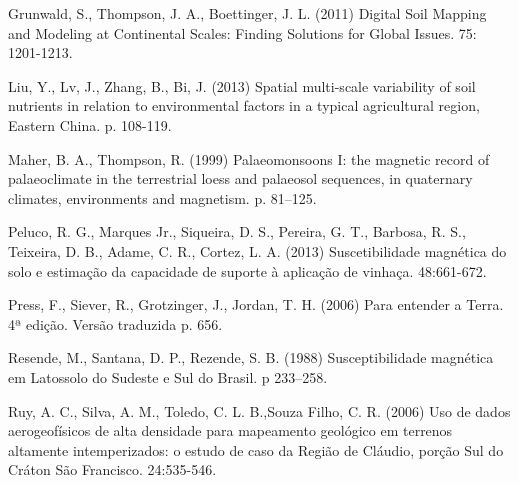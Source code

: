 \begin{footnotesize}
\begin{thebibliography}{99}
Grunwald, S., Thompson, J. A., Boettinger, J. L. (2011)
\newblock Digital Soil Mapping and Modeling at Continental Scales: Finding Solutions for Global Issues.
 75: 1201-1213.




Liu, Y., Lv, J., Zhang, B., Bi, J. (2013)
\newblock Spatial multi-scale variability of soil nutrients in relation to environmental factors in a typical agricultural region, Eastern China.
 p. 108-119.




Maher, B. A., Thompson, R. (1999)
\newblock Palaeomonsoons I: the magnetic record of palaeoclimate in the terrestrial loess and palaeosol sequences, in quaternary climates, environments and magnetism.
 p. 81–125.




Peluco, R. G., Marques Jr., Siqueira, D. S., Pereira, G. T., Barbosa, R. S., Teixeira, D. B., Adame, C. R., Cortez, L. A. (2013)
\newblock Suscetibilidade magnética do solo e estimação da capacidade de suporte à aplicação de vinhaça.
 48:661-672.




Press, F., Siever, R., Grotzinger, J., Jordan, T. H. (2006)
\newblock Para entender a Terra. 4ª edição. Versão traduzida
 p. 656.




Resende, M., Santana, D. P., Rezende, S. B. (1988)
\newblock Susceptibilidade magnética em Latossolo do Sudeste e Sul do Brasil.
 p 233–258.




Ruy, A. C., Silva, A. M., Toledo, C. L. B.,Souza Filho, C. R. (2006)
\newblock Uso de dados aerogeofísicos de alta densidade para mapeamento geológico em terrenos altamente intemperizados: o estudo de caso da Região de Cláudio, porção Sul do Cráton São Francisco.
 24:535-546.





\end{thebibliography}
\end{footnotesize}
